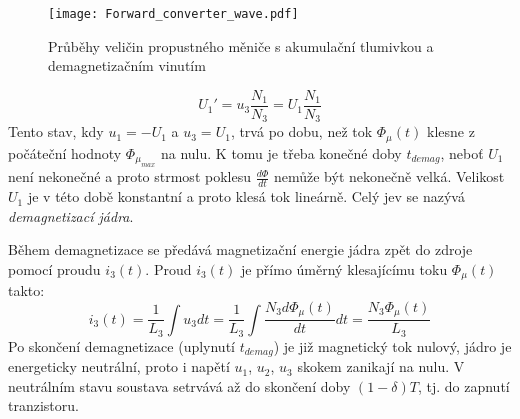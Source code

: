     \begin{figure}[ht!]
      \centering
      \texttt{[image: Forward\_converter\_wave.pdf]}
      \caption{Průběhy veličin propustného měniče s akumulační tlumivkou a demagnetizačním 
      vinutím}
      \label{enz:fig_Forward_demag_wave} 
    \end{figure}                          
    
    \begin{equation}\label{ENZ:eq_forward_u1_demag}
     U_1'=u_3\frac{N_1}{N_3} = U_1\frac{N_1}{N_3}
    \end{equation}
    Tento stav, kdy  $u_1 = -U_1$ a  $u_3 = U_1$, trvá po dobu, než tok $\Phi_\mu(t)$ klesne z 
    počáteční hodnoty $\Phi_{\mu_{max}}$ na nulu. K tomu je třeba konečné doby $t_{demag}$, neboť 
    $U_1$ není nekonečné a proto strmost poklesu $\frac{d\Phi}{dt}$ nemůže být nekonečně velká. 
    Velikost $U_1$ je v této době konstantní a proto klesá tok lineárně. Celý jev se nazývá 
    \emph{demagnetizací jádra}.
    
    Během demagnetizace se předává magnetizační energie jádra zpět do zdroje pomocí proudu 
    $i_3(t)$. Proud $i_3(t)$ je přímo úměrný klesajícímu toku $\Phi_\mu(t)$ takto:
    \begin{equation}\label{ENZ:eq_imag_phi_forward}
     i_3(t) = \frac{1}{L_3}\int{u_3}dt = \frac{1}{L_3}\int{\frac{N_3d\Phi_\mu(t)}{dt}}dt =
     \frac{N_3\Phi_\mu(t)}{L_3}
    \end{equation}
    Po skončení demagnetizace (uplynutí $t_{demag}$) je již magnetický tok nulový, jádro je 
    energeticky neutrální, proto i napětí $u_1$, $u_2$, $u_3$ skokem zanikají na nulu. V 
    neutrálním stavu soustava setrvává až do skončení doby $(1-\delta)T$, tj. do zapnutí 
    tranzistoru.
    
